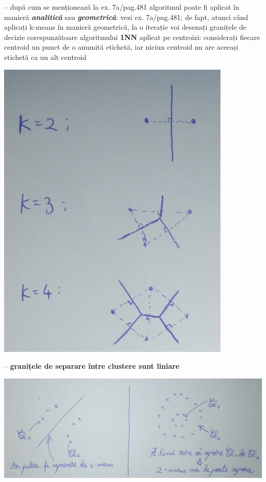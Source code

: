 \documentclass[12pt]{article}
\begin{document}
	-- după cum se menționează la ex. 7a/pag.481 algoritmul poate fi aplicat în manieră \textit{\textbf{analitică}} sau \textit{\textbf{geometrică}}: vezi ex. 7a/pag.481; de fapt, atunci când aplicați k-means în manieră geometrică, la o iterație voi desenați granițele de decizie corespunzătoare algoritmului \textbf{1NN} aplicat pe centroizi: considerați fiecare centroid un punct de o anumită etichetă, iar niciun centroid nu are aceeași etichetă ca un alt centroid
	\begin{center}
		\includegraphics{screenshot002}
	\end{center}
	\newpage
	-- \textbf{granițele de separare între clustere sunt liniare}
	\begin{center}
		\includegraphics[width=1\linewidth]{screenshot003}
	\end{center}
	
\end{document}

